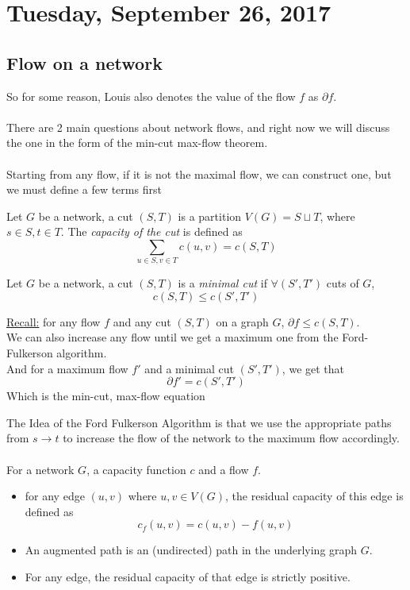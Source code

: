 \documentclass[12pt]{article}
\begin{document}
\newpage

\section{Tuesday, September 26, 2017}

\subsection{Flow on a network}

So for some reason, Louis also denotes the value of the flow $f$ as $\partial f$.\\
\\
There are 2 main questions about network flows, and right now we will discuss the one in the form of the min-cut max-flow theorem.\\
\\
Starting from any flow, if it is not the maximal flow, we can construct one, but we must define a few terms first

\begin{tcolorbox}[title=Definition: Cut in a Network]
	Let $G$ be a network, a cut $(S,T)$ is a partition $V(G) = S \sqcup T$, where $s\in S, t \in T$. The \textit{capacity of the cut} is defined as
	$$\sum_{u\in S, v\in T} c(u,v) = c(S,T)$$
\end{tcolorbox}

\begin{tcolorbox}[title=Definition: Minimal Cut]
	Let $G$ be a network, a cut $(S,T)$ is a \textit{minimal cut} if $\forall (S', T')$ cuts of $G$, $$c(S,T) \leq c(S',T')$$
\end{tcolorbox}

\begin{tcolorbox}
	\underline{Recall:} for any flow $f$ and any cut $(S,T)$ on a graph $G$, $\partial f \leq c(S,T)$.\\
	We can also increase any flow until we get a maximum one from the Ford-Fulkerson algorithm.\\
	And for a maximum flow $f'$ and a minimal cut $(S',T')$, we get that $$\partial f' = c(S',T')$$
	Which is the min-cut, max-flow equation
\end{tcolorbox}

The Idea of the Ford Fulkerson Algorithm is that we use the appropriate paths from $s\rightarrow t$ to increase the flow of the network to the maximum flow accordingly.\\
\\
For a network $G$, a capacity function $c$ and a flow $f$.
\begin{itemize}
	\item{for any edge $(u,v)$ where $u,v \in V(G)$, the residual capacity of this edge is defined as $$c_f (u,v) = c(u,v) - f(u,v)$$}
	\item{An augmented path is an (undirected) path in the underlying graph $G$.}
	\item{For any edge, the residual capacity of that edge is strictly positive.}
\end{itemize}
\end{document}
